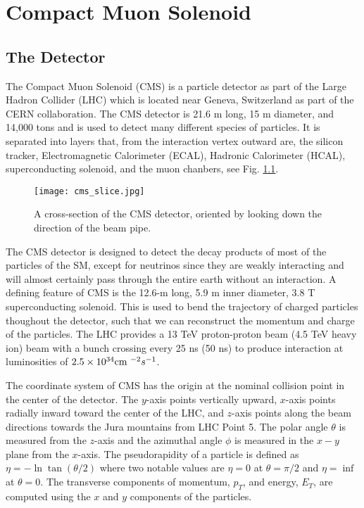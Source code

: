 \chapter{Compact Muon Solenoid}
\label{ch:CMS}

\section{The Detector}
\label{sec:cmsIntro}

The Compact Muon Solenoid (CMS) is a particle detector as part of the Large Hadron Collider (LHC) which is located near Geneva, Switzerland as part of the CERN collaboration. The CMS detector is 21.6 m long, 15 m diameter, and 14,000 tons and is used to detect many different species of particles. It is separated into layers that, from the interaction vertex outward are, the silicon tracker, Electromagnetic Calorimeter (ECAL), Hadronic Calorimeter (HCAL), superconducting solenoid, and the muon chanbers, see Fig. \ref{CMSSlice}. 

\begin{figure}
 	\centering
	\texttt{[image: cms\_slice.jpg]}
 	\caption{A cross-section of the CMS detector, oriented by looking down the direction of the beam pipe. }
 	\label{CMSSlice} 
\end{figure}

The CMS detector is designed to detect the decay products of most of the particles of the SM, except for neutrinos since they are weakly interacting and will almost certainly pass through the entire earth without an interaction. A defining feature of CMS is the 12.6-m long, 5.9 m inner diameter, 3.8 T superconducting solenoid. This is used to bend the trajectory of charged particles thoughout the detector, such that we can reconstruct the momentum and charge of the particles. The LHC provides a 13 TeV proton-proton beam (4.5 TeV heavy ion) beam with a bunch crossing every 25 ns (50 ns) to produce interaction at luminosities of $2.5\times10^{34} \text{cm }^{-2}s^{-1}$. 

The coordinate system of CMS has the origin at the nominal collision point in the center of the detector. The $y$-axis points vertically upward, $x$-axis points radially inward toward the center of the LHC, and $z$-axis points along the beam directions towards the Jura mountains from LHC Point 5. The polar angle $\theta$ is measured from the $z$-axis and the azimuthal angle $\phi$ is measured in the $x-y$ plane from the $x$-axis. The pseudorapidity of a particle is defined as $\eta=-\ln\tan(\theta/2)$ where two notable values are $\eta=0$ at $\theta=\pi/2$ and $\eta=\inf$ at $\theta=0$. The transverse components of momentum, $p_T$, and energy, $E_T$, are computed using the $x$ and $y$ components of the particles. 

